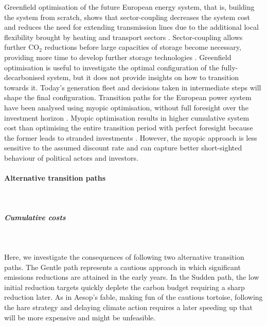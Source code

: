 \documentclass[5p]{elsarticle} %
\begin{document}
Greenfield optimisation of the future European energy system, that is, building the system from scratch, shows that sector-coupling decreases the system cost and reduces the need for extending transmission lines due to the additional local flexibility brought by heating and transport sectors \cite{Brown_2018}. Sector-coupling allows further CO$_2$ reductions before large capacities of storage become necessary, providing more time to develop further storage technologies \cite{Victoria_2019_storage}. Greenfield optimisation is useful to investigate the optimal configuration of the fully-decarbonised system, but it does not provide insights on how to transition towards it. Today's generation fleet and decisions taken in intermediate steps will shape the final configuration. Transition paths for the European power system have been analysed using myopic optimisation, without full foresight over the investment horizon \cite{Bogdanov_2019, Plesmann_2017, Gerbaulet_2019, Poncelet_2016}. Myopic optimisation results in higher cumulative system cost than optimising the entire transition period with perfect foresight because the former leads to stranded investments \cite{Gerbaulet_2019, Heuberger_2018}. However, the myopic approach is less sensitive to the assumed discount rate and can capture better short-sighted behaviour of political actors and investors. 

\paragraph{\textbf{Alternative transition paths}} \
\subparagraph{\textbf{Cumulative costs}} \

Here, we investigate the consequences of following two alternative transition paths. The Gentle path represents a cautious approach in which significant emissions reductions are attained in the early years. In the Sudden path, the low initial reduction targets quickly deplete the carbon budget requiring a sharp reduction later. As in Aesop's fable, making fun of the cautious tortoise, following the hare strategy and delaying climate action requires a later speeding up that will be more expensive and might be unfeasible.  \
\end{document}
